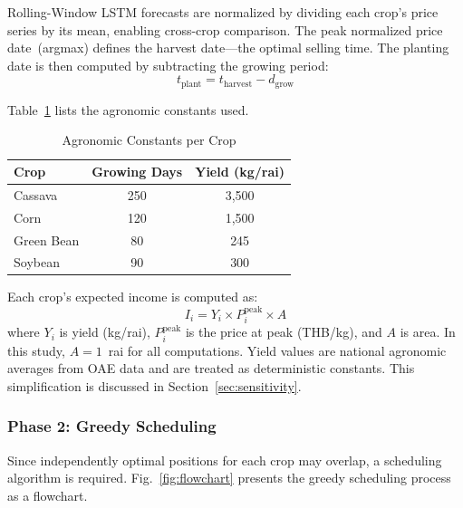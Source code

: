 \documentclass[journal]{IEEEtran}
\begin{document}
Rolling-Window LSTM forecasts are normalized by dividing each crop's price series by its mean, enabling cross-crop comparison. The peak normalized price date~(argmax) defines the harvest date---the optimal selling time. The planting date is then computed by subtracting the growing period:
\begin{equation}
  t_{\text{plant}} = t_{\text{harvest}} - d_{\text{grow}}
\end{equation}

Table~\ref{tab:agro} lists the agronomic constants used.

\begin{table}[htbp]
  \centering
  \caption{Agronomic Constants per Crop}
  \label{tab:agro}
  \begin{tabular}{lcc}
    \toprule
    \textbf{Crop} & \textbf{Growing Days} & \textbf{Yield (kg/rai)} \\
    \midrule
    Cassava & 250 & 3,500 \\
    Corn & 120 & 1,500 \\
    Green Bean & 80 & 245 \\
    Soybean & 90 & 300 \\
    \bottomrule
  \end{tabular}
\end{table}

Each crop's expected income is computed as:
\begin{equation}
  I_i = Y_i \times P_i^{\text{peak}} \times A
  \label{eq:income}
\end{equation}
where $Y_i$ is yield (kg/rai), $P_i^{\text{peak}}$ is the price at peak (THB/kg), and $A$ is area. In this study, $A = 1$~rai for all computations. Yield values are national agronomic averages from OAE data and are treated as deterministic constants. This simplification is discussed in Section~\ref{sec:sensitivity}.

\subsubsection{Phase 2: Greedy Scheduling}

Since independently optimal positions for each crop may overlap, a scheduling algorithm is required. Fig.~\ref{fig:flowchart} presents the greedy scheduling process as a flowchart.
\end{document}
